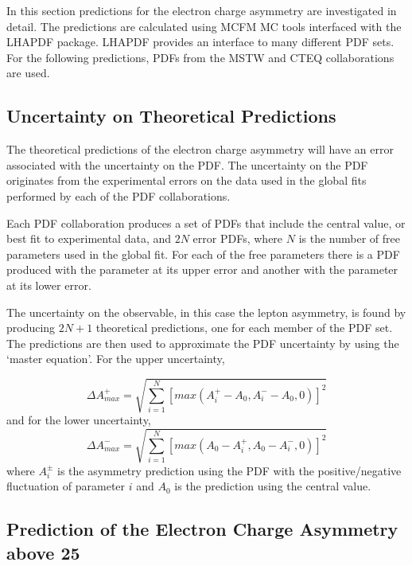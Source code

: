 In this section predictions for the electron charge asymmetry are investigated in
detail.  The predictions are calculated using MCFM\cite{campbellmcfm} {MC} tools
interfaced with the LHAPDF package\cite{whalley2005houches}.  LHAPDF provides an
interface to many different {PDF} sets. For the following predictions, PDFs from
the MSTW \cite{martin2009parton} and CTEQ \cite{lai2010vv} collaborations are
used.

\subsection{Uncertainty on Theoretical Predictions}
The theoretical predictions of the electron charge asymmetry will have an error
associated with the uncertainty on the {PDF}.
The uncertainty on the {PDF} originates from the experimental errors on the
data used in the global fits performed by each of the {PDF} collaborations.



Each {PDF} collaboration produces a set of {PDFs} that include the
central value, or best fit to experimental data, and $2N$ error {PDFs}, where
$N$ is the number of free parameters used in the global
fit\cite{Bourilkov:2006cj}.
For each of the free parameters there is a PDF produced with the parameter at its upper
error and another with the parameter at its lower error. 

The uncertainty on the observable, in this case the lepton asymmetry, is found
by producing $2N+1$ theoretical predictions, one for each member of the {PDF}
set. The predictions are then used to approximate the {PDF} uncertainty by
using the `master equation'\cite{Bourilkov:2006cj,campbell2006hard}.
For the upper uncertainty,

\begin{equation}
\Delta A^{+}_{max}
= \sqrt{ \sum^{N}_{i=1} \left[ max( A^{+}_i-A_{0}, A^{-}_i-A_{0}, 0 ) \right]^{2}}
\end{equation}
and for the lower uncertainty,
\begin{equation}
\Delta A^{-}_{max}
= \sqrt{ \sum^{N}_{i=1} \left[ max( A_{0}-A^{+}_i, A_{0}-A^{-}_i, 0 ) \right]^{2}}
\end{equation}
where $A^{\pm}_{i}$ is the asymmetry prediction using the {PDF} with the
positive/negative fluctuation of parameter $i$ and $A_{0}$ is the prediction
using the central value.

\subsection{Prediction of the Electron Charge Asymmetry above \unit{25}{\GeV}}

